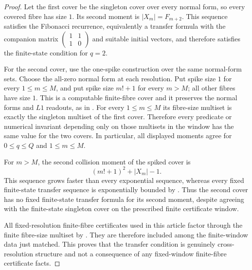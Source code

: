 \begin{proof}
Let the first cover be the singleton cover over every normal form, so every
covered fibre has size \(1\).  Its second moment is \(|X_m|=F_{m+2}\).  This
sequence satisfies the Fibonacci recurrence, equivalently a transfer formula
with the companion matrix
\(\begin{pmatrix}1&1\\1&0\end{pmatrix}\) and suitable initial vectors, and
therefore satisfies the finite-state condition for \(q=2\).

For the second cover, use the one-spike construction over the same normal-form
sets.  Choose the all-zero normal form at each resolution.  Put spike size
\(1\) for every \(1\le m\le M\), and put spike size \(m!+1\) for every
\(m>M\); all other fibres have size \(1\).  This is a computable finite-fibre
cover and it preserves the normal forms and \(L1\) readouts, as in
.  For every \(1\le m\le M\) its fibre-size
multiset is exactly the singleton multiset of the first cover.  Therefore every
predicate or numerical invariant depending only on those multisets in the window
has the same value for the two covers.  In particular, all displayed moments
agree for \(0\le q\le Q\) and \(1\le m\le M\).

For \(m>M\), the second collision moment of the spiked cover is
\[
  (m!+1)^2+|X_m|-1 .
\]
This sequence grows faster than every exponential sequence, whereas every fixed
finite-state transfer sequence is exponentially bounded by
.  Thus the second cover has no fixed
finite-state transfer formula for its second moment, despite agreeing with the
finite-state singleton cover on the prescribed finite certificate window.

All fixed-resolution finite-fibre certificates used in this article factor
through the finite fibre-size multiset by
.
They are therefore included among the finite-window data just matched.  This
proves that the transfer condition is genuinely cross-resolution structure and
not a consequence of any fixed-window finite-fibre certificate facts.
\end{proof}

